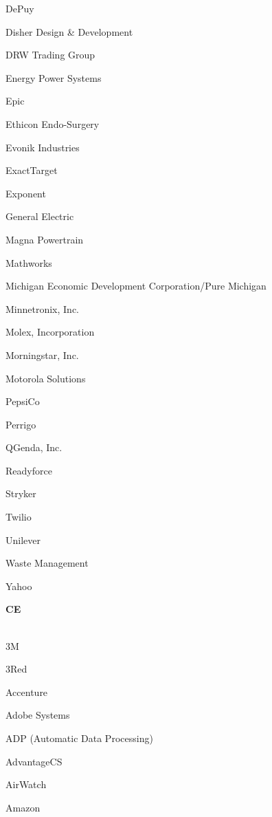 \documentclass[twoside]{article}
\begin{document}
\begin{center}
\begin{multicols}{5}
\begin{FlushLeft}
\begin{compactitem}
\item DePuy
\item Disher Design \& Development
\item DRW Trading Group
\item Energy Power Systems
\item Epic
\item Ethicon Endo-Surgery
\item Evonik Industries
\item ExactTarget
\item Exponent
\item General Electric
\item Magna Powertrain
\item Mathworks
\item Michigan Economic Development Corporation/Pure Michigan
\item Minnetronix, Inc.
\item Molex, Incorporation
\item Morningstar, Inc.
\item Motorola Solutions
\item PepsiCo
\item Perrigo
\item QGenda, Inc.
\item Readyforce
\item Stryker
\item Twilio
\item Unilever
\item Waste Management
\item Yahoo
\end{compactitem}
        \end{FlushLeft}
        \vspace{1em}
        {\fontsize{14}{16}\selectfont \bf CE}\\
        \vspace{-1em}
        ~\hrulefill~
        \vspace{-.9em}
        \begin{FlushLeft}
        \begin{compactitem}
        \item 3M
\item 3Red
\item Accenture
\item Adobe Systems
\item ADP (Automatic Data Processing)
\item AdvantageCS
\item AirWatch
\item Amazon

\end{compactitem}
\end{FlushLeft}
\end{multicols}
\end{center}
\end{document}
